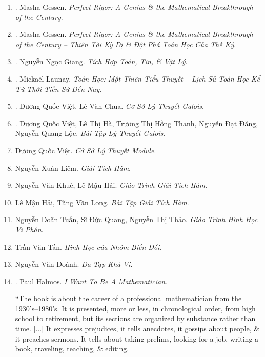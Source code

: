 \documentclass{article}
\begin{document}
\begin{enumerate}
	\item \cite{Gessen2009}. Masha Gessen. {\it Perfect Rigor: A Genius \& the Mathematical Breakthrough of the Century}.\hfill{\sf[done]}
	
	\item \cite{Gessen2022}. Masha Gessen. {\it Perfect Rigor: A Genius \& the Mathematical Breakthrough of the Century -- Thiên Tài Kỳ Dị \& Đột Phá Toán Học Của Thế Kỷ}.\hfill{\sf[reading]}
	\item \cite{Giang_tich_hop_Toan_Tin_Ly}. Nguyễn Ngọc Giang. {\it Tích Hợp Toán, Tin, \& Vật Lý}.\hfill{\sf[reading]}
	
	\item \cite{Launay2022}. Micka\"el Launay. {\it Toán Học: Một Thiên Tiểu Thuyết -- Lịch Sử Toán Học Kể Từ Thời Tiền Sử Đến Nay}.\hfill{\sf[done]}
	
	\item \cite{Viet_Chua2022}. Dương Quốc Việt, Lê Văn Chua. {\it Cơ Sở Lý Thuyết Galois}.\hfill{\sf[reading]}
	
	\item \cite{Viet_Ha_Thanh_Dang_Loc2022}. Dương Quốc Việt, Lê Thị Hà, Trương Thị Hồng Thanh, Nguyễn Đạt Đăng, Nguyễn Quang Lộc. {\it Bài Tập Lý Thuyết Galois}.\hfill{\sf[reading]}
	\item Dương Quốc Việt. {\it Cở Sở Lý Thuyết Module}.
	
	\item Nguyễn Xuân Liêm. {\it Giải Tích Hàm}.
	
	\item Nguyễn Văn Khuê, Lê Mậu Hải. {\it Giáo Trình Giải Tích Hàm}.
	
	\item Lê Mậu Hải, Tăng Văn Long. {\it Bài Tập Giải Tích Hàm}.
	
	\item Nguyễn Doãn Tuấn, Sĩ Đức Quang, Nguyễn Thị Thảo. {\it Giáo Trình Hình Học Vi Phân}.
	
	\item Trần Văn Tấn. {\it Hình Học của Nhóm Biến Đổi}.
	
	\item Nguyễn Văn Đoành. {\it Đa Tạp Khả Vi}.
	
	\item \cite{Halmos1985}. {\sc Paul Halmos}. {\it I Want To Be A Mathematician}.
	
	``The book is about the career of a professional mathematician from the 1930's--1980's. It is presented, more or less, in chronological order, from high school to retirement, but its sections are organized by substance rather than time. [$\ldots$] It expresses prejudices, it tells anecdotes, it gossips about people, \& it preaches sermons. It tells about taking prelims, looking for a job, writing a book, traveling, teaching, \& editing.
	

\end{enumerate}
\end{document}
